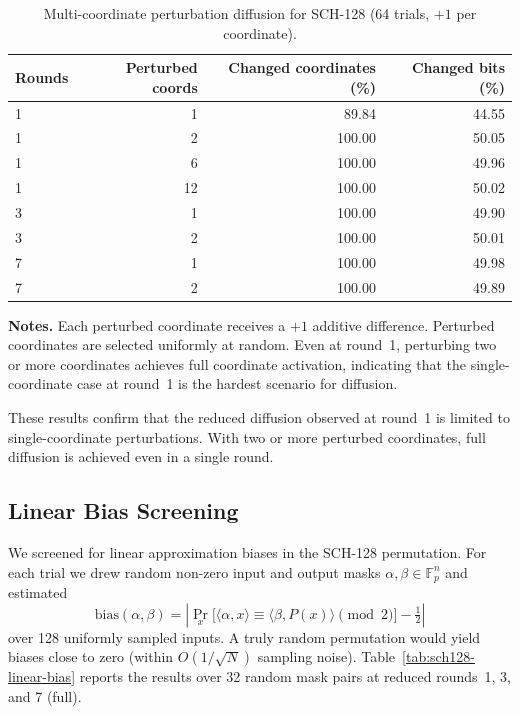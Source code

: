 ﻿\documentclass[english]{aucmcs}
\begin{document}
\begin{table}[H]
\centering
\caption{Multi-coordinate perturbation diffusion for SCH-128 (64 trials, $+1$ per coordinate).}
\label{tab:sch128-multi-coord-diffusion}
\begin{tabular}{@{}lrrr@{}}
\toprule
Rounds & Perturbed coords & Changed coordinates (\%) & Changed bits (\%) \\
\midrule
1 & 1  & 89.84 & 44.55 \\
1 & 2  & 100.00 & 50.05 \\
1 & 6  & 100.00 & 49.96 \\
1 & 12 & 100.00 & 50.02 \\
3 & 1  & 100.00 & 49.90 \\
3 & 2  & 100.00 & 50.01 \\
7 & 1  & 100.00 & 49.98 \\
7 & 2  & 100.00 & 49.89 \\
\bottomrule
\end{tabular}
\vspace{0.5em}
\begin{minipage}{0.95\linewidth}
\small
\textbf{Notes.} Each perturbed coordinate receives a $+1$ additive difference.
Perturbed coordinates are selected uniformly at random. Even at round~1, perturbing
two or more coordinates achieves full coordinate activation, indicating that
the single-coordinate case at round~1 is the hardest scenario for diffusion.
\end{minipage}
\end{table}

These results confirm that the reduced diffusion observed at round~1 is limited
to single-coordinate perturbations. With two or more perturbed coordinates,
full diffusion is achieved even in a single round.

\subsection{Linear Bias Screening}
\label{sec:linear-screening}

We screened for linear approximation biases in the SCH-128 permutation.
For each trial we drew random non-zero input and output masks
$\alpha, \beta \in \mathbb{F}_p^n$ and estimated
\[
  \mathrm{bias}(\alpha, \beta) = \left| \Pr_x\bigl[\langle \alpha, x \rangle \equiv \langle \beta, P(x) \rangle \pmod{2}\bigr] - \tfrac{1}{2} \right|
\]
over 128 uniformly sampled inputs. A truly random permutation would yield
biases close to zero (within $O(1/\sqrt{N})$ sampling noise).
Table~\ref{tab:sch128-linear-bias} reports the results over 32 random
mask pairs at reduced rounds~1, 3, and 7 (full).
\end{document}
